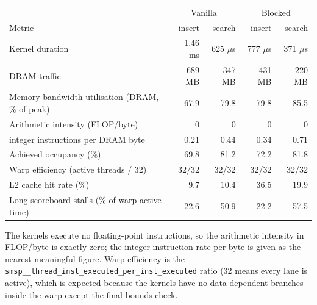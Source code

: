 \documentclass[11pt]{article}
\begin{document}
\begin{center}
\small
\begin{tabular}{lrrrr}
\toprule
 & \multicolumn{2}{c}{Vanilla} & \multicolumn{2}{c}{Blocked} \\
Metric & insert & search & insert & search \\
\midrule
Kernel duration & 1.46 ms & 625 $\mu$s & 777 $\mu$s & 371 $\mu$s \\
DRAM traffic & 689 MB & 347 MB & 431 MB & 220 MB \\
Memory bandwidth utilisation (DRAM, \% of peak) & 67.9 & 79.8 & 79.8 & 85.5 \\
Arithmetic intensity (FLOP/byte) & 0 & 0 & 0 & 0 \\
\quad integer instructions per DRAM byte & 0.21 & 0.44 & 0.34 & 0.71 \\
Achieved occupancy (\%) & 69.8 & 81.2 & 72.2 & 81.8 \\
Warp efficiency (active threads / 32) & 32/32 & 32/32 & 32/32 & 32/32 \\
L2 cache hit rate (\%) & 9.7 & 10.4 & 36.5 & 19.9 \\
Long-scoreboard stalls (\% of warp-active time) & 22.6 & 50.9 & 22.2 & 57.5 \\
\bottomrule
\end{tabular}
\end{center}
The kernels execute no floating-point instructions, so the arithmetic
intensity in FLOP/byte is exactly zero; the integer-instruction rate per byte
is given as the nearest meaningful figure. Warp efficiency is the
\texttt{smsp\_\_thread\_inst\_executed\_per\_inst\_executed} ratio (32 means
every lane is active), which is expected because the kernels have no
data-dependent branches inside the warp except the final bounds check.
\end{document}
